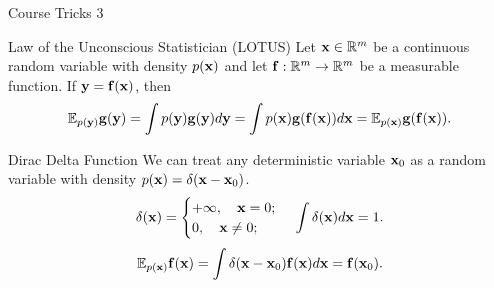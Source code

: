 \documentclass{beamer}
\begin{document}
\begin{frame}{Course Tricks 3}
	\begin{block}{Law of the Unconscious Statistician (LOTUS)}
		Let $\mathbf{x} \in \mathbb{R}^m$ be a continuous random variable with density $p(\mathbf{x})$ and let $\mathbf{f}: \mathbb{R}^m \rightarrow \mathbb{R}^m$ be a measurable function. If $\mathbf{y} = \mathbf{f}(\mathbf{x})$, then
		$$
			\mathbb{E}_{p(\mathbf{y})} \mathbf{g}(\mathbf{y}) = \int p(\mathbf{y}) \mathbf{g}(\mathbf{y}) d\mathbf{y} = \int p(\mathbf{x}) \mathbf{g}(\mathbf{f}(\mathbf{x})) d\mathbf{x} = \mathbb{E}_{p(\mathbf{x})} \mathbf{g}(\mathbf{f}(\mathbf{x})).
		$$
		\vspace{-0.4cm}
	\end{block}
	\begin{block}{Dirac Delta Function}
		We can treat any deterministic variable $\mathbf{x}_0$ as a random variable with density $p(\mathbf{x}) = \delta(\mathbf{x} - \mathbf{x}_0)$. 
		\vspace{-0.3cm}
		$$
			\delta(\mathbf{x}) = 
			\begin{cases}
				+\infty, \quad \mathbf{x} = 0; \\
				0, \quad \mathbf{x} \neq 0;
			\end{cases} \, 
			\int \delta(\mathbf{x}) d\mathbf{x} = 1.
		$$
		$$
			\mathbb{E}_{p(\mathbf{x})}\mathbf{f}(\mathbf{x}) = \int \delta (\mathbf{x} - \mathbf{x}_0) \mathbf{f}(\mathbf{x}) d\mathbf{x} = \mathbf{f}(\mathbf{x}_0).
		$$
	\end{block}
\end{frame}
\end{document}
